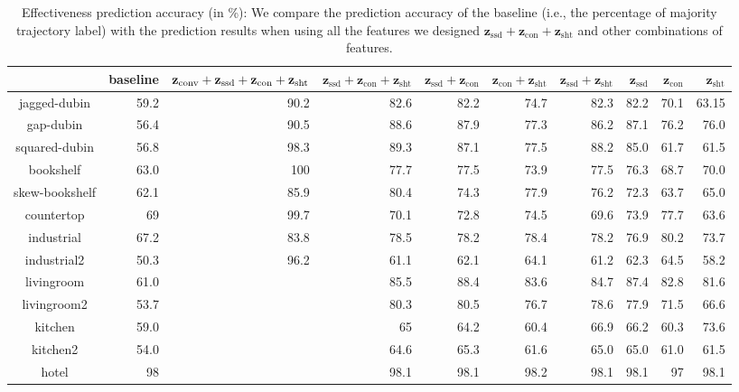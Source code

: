 \documentclass[letterpaper, 10 pt, conference]{ieeeconf}  %
\newcommand{\fssd}{\mbox{$\mathbf z_{\text{ssd}}$}}
\newcommand{\fcon}{\mbox{$\mathbf z_{\text{con}}$}}
\newcommand{\fsht}{\mbox{$\mathbf z_{\text{sht}}$}}
\begin{document}
\begin{table}[tbp]
\centering
\begin{tabular}{|c|r|r|r|r|r|r|r|r|r|}
\hline 
 & baseline & ${\bf z}_\textrm{conv} +\fssd+\fcon+\fsht$  & $\fssd+\fcon+\fsht$ & $\fssd+\fcon$ & $\fcon+\fsht$ & $\fssd+\fsht$ & $\fssd$ & $\fcon$ & $\fsht$ \\ \hline \hline
jagged-dubin & 59.2 & 90.2  & 82.6	& 82.2 & 74.7 & 82.3 & 82.2 & 70.1 & 63.15 \\ \hline
gap-dubin & 56.4 & 90.5 & 88.6 & 87.9 & 77.3 & 86.2 & 87.1 & 76.2 & 76.0 \\ \hline
squared-dubin & 56.8 & 98.3 & 89.3 & 	87.1 & 	77.5 &	88.2 &	85.0 &	 61.7	& 61.5 \\ \hline \hline

bookshelf & 63.0 & 100 & 77.7 & 	77.5 &	73.9 &	77.5 &	76.3 &	68.7 & 70.0 \\ \hline
skew-bookshelf & 62.1 & 85.9 & 80.4 &	74.3 & 	77.9 & 	76.2 &	72.3 &	63.7 &	65.0 \\ \hline
countertop & 69 & 99.7 & 70.1	& 72.8 & 	74.5	 & 69.6 & 	73.9 &	77.7 &	63.6 \\ \hline
industrial & 67.2 & 83.8 & 78.5 &	78.2 &	78.4 &	78.2 &	76.9 &	80.2 & 	73.7 \\ \hline
industrial2 & 50.3 & 96.2 & 61.1 & 	62.1	 & 64.1 &	61.2 & 	62.3 & 	64.5 &	58.2 \\ \hline \hline

livingroom & 61.0 & & 85.5	& 88.4 &	 83.6 &	84.7 &	87.4 & 	82.8 &	81.6 \\ \hline
livingroom2 & 53.7 & & 80.3 &	 80.5	& 76.7 &	 78.6 &	77.9 & 	71.5 & 	66.6 \\ \hline
kitchen & 59.0 & & 65 & 	64.2 & 	60.4 &	66.9 & 	66.2 & 	60.3 & 	73.6 \\ \hline
kitchen2 & 54.0 & & 64.6 &	65.3 & 	61.6 & 	65.0 & 	65.0 & 	61.0 &	61.5 \\ \hline
hotel & 98 & & 98.1 &	98.1 & 	98.2 &	98.1 &	98.1 &	97	& 98.1 \\ \hline
\end{tabular}
\caption{Effectiveness prediction accuracy (in \%): We compare the prediction accuracy of the baseline (i.e., the percentage of majority trajectory label) with the prediction results when using all the features we designed $\fssd+\fcon+\fsht$ and other combinations of features.}
\label{tab:result}
\end{table}
\end{document}

